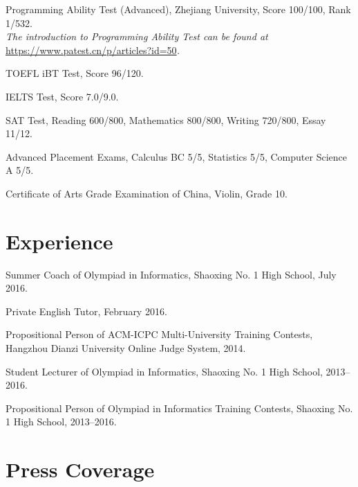 \documentclass[letterpaper]{article}
\renewenvironment{itemize}{
  \begin{list}{}{
    \setlength{\leftmargin}{1.5em}
  }
}{
  \end{list}
}
\begin{document}
\begin{itemize}
  \item Programming Ability Test (Advanced), Zhejiang University, Score 100/100, Rank 1/532.\\
  \emph{The introduction to Programming Ability Test can be found at }\url{https://www.patest.cn/p/articles?id=50}\emph{.}

  \item TOEFL iBT Test, Score 96/120.

  \item IELTS Test, Score 7.0/9.0.

  \item SAT Test, Reading 600/800, Mathematics 800/800, Writing 720/800, Essay 11/12.

  \item Advanced Placement Exams, Calculus BC 5/5, Statistics 5/5, Computer Science A 5/5.

  \item Certificate of Arts Grade Examination of China, Violin, Grade 10.
\end{itemize}


\section*{Experience}

\begin{itemize}
  \item Summer Coach of Olympiad in Informatics, Shaoxing No. 1 High School, July 2016.

  \item Private English Tutor, February 2016.

  \item Propositional Person of ACM-ICPC Multi-University Training Contests, Hangzhou Dianzi University Online Judge System, 2014.

  \item Student Lecturer of Olympiad in Informatics, Shaoxing No. 1 High School, 2013--2016.
 
  \item Propositional Person of Olympiad in Informatics Training Contests, Shaoxing No. 1 High School, 2013--2016.
\end{itemize}


\section*{Press Coverage}
\end{document}
